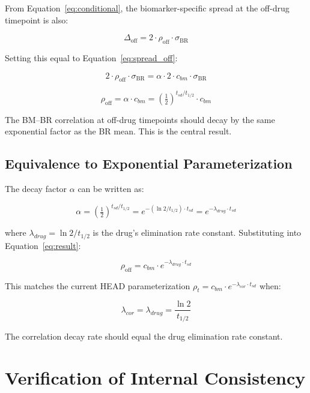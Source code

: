 \documentclass[11pt]{article}
\begin{document}
From Equation~\ref{eq:conditional}, the biomarker-specific
spread at the off-drug timepoint is also:

\[
\Delta_{\text{off}} = 2 \cdot \rho_{\text{off}} \cdot
  \sigma_{\text{BR}}
\]

Setting this equal to Equation~\ref{eq:spread_off}:

\[
2 \cdot \rho_{\text{off}} \cdot \sigma_{\text{BR}}
= \alpha \cdot 2 \cdot c_{bm} \cdot \sigma_{\text{BR}}
\]

\begin{equation}
\boxed{\rho_{\text{off}} = \alpha \cdot c_{bm}
= \left(\tfrac{1}{2}\right)^{t_{sd}/t_{1/2}} \cdot c_{bm}}
\label{eq:result}
\end{equation}

The BM--BR correlation at off-drug timepoints should decay by
the same exponential factor as the BR mean. This is the central
result.

\subsection{Equivalence to Exponential Parameterization}

The decay factor $\alpha$ can be written as:

\[
\alpha = \left(\tfrac{1}{2}\right)^{t_{sd}/t_{1/2}}
= e^{-(\ln 2 / t_{1/2}) \cdot t_{sd}}
= e^{-\lambda_{drug} \cdot t_{sd}}
\]

where $\lambda_{drug} = \ln 2 / t_{1/2}$ is the drug's
elimination rate constant. Substituting into
Equation~\ref{eq:result}:

\[
\rho_{\text{off}} = c_{bm} \cdot
  e^{-\lambda_{drug} \cdot t_{sd}}
\]

This matches the current HEAD parameterization
$\rho_t = c_{bm} \cdot e^{-\lambda_{cor} \cdot t_{sd}}$
when:

\begin{equation}
\boxed{\lambda_{cor} = \lambda_{drug} = \frac{\ln 2}{t_{1/2}}}
\label{eq:lambda}
\end{equation}

The correlation decay rate should equal the drug elimination
rate constant.

\section{Verification of Internal Consistency}
\end{document}
